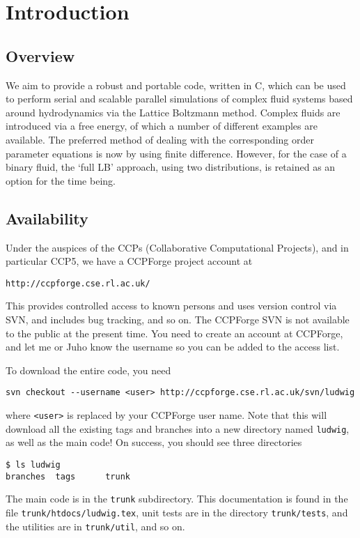 %
%
%
%
%
%

\section{Introduction}

\subsection{Overview}

We aim to provide a robust and portable code, written in C, which
can be used to perform serial and scalable parallel simulations of
complex fluid systems based around hydrodynamics via the Lattice
Boltzmann method. Complex fluids are introduced via a free energy,
of which a number of different examples are available. The preferred
method of dealing with the corresponding order parameter equations
is now by using finite difference. However, for the case of a binary
fluid, the `full LB' approach, using two distributions, is retained
as an option for the time being.

\subsection{Availability}

Under the auspices of the CCPs (Collaborative Computational Projects),
and in particular CCP5, we have a CCPForge project account at

\texttt{http://ccpforge.cse.rl.ac.uk/}

This provides controlled access to known persons and uses version
control via SVN, and includes bug
tracking, and so on. The CCPForge SVN is not available to the public
at the present time. You need to create an account at CCPForge, and
let me or Juho know the username so you can be added to the access list.

To download the entire code, you need
\begin{verbatim}
svn checkout --username <user> http://ccpforge.cse.rl.ac.uk/svn/ludwig
\end{verbatim}
where \texttt{<user>} is replaced by your CCPForge user name.
Note that this will download all the existing tags and branches
into a new directory named \texttt{ludwig}, as well as the main code!
On success, you should see three directories
\begin{verbatim}
$ ls ludwig
branches  tags      trunk
\end{verbatim}
The main code is in the \texttt{trunk} subdirectory. This documentation is
found in the file \texttt{trunk/htdocs/ludwig.tex}, unit tests are in
the directory \texttt{trunk/tests}, and the utilities are in
\texttt{trunk/util}, and so on.

